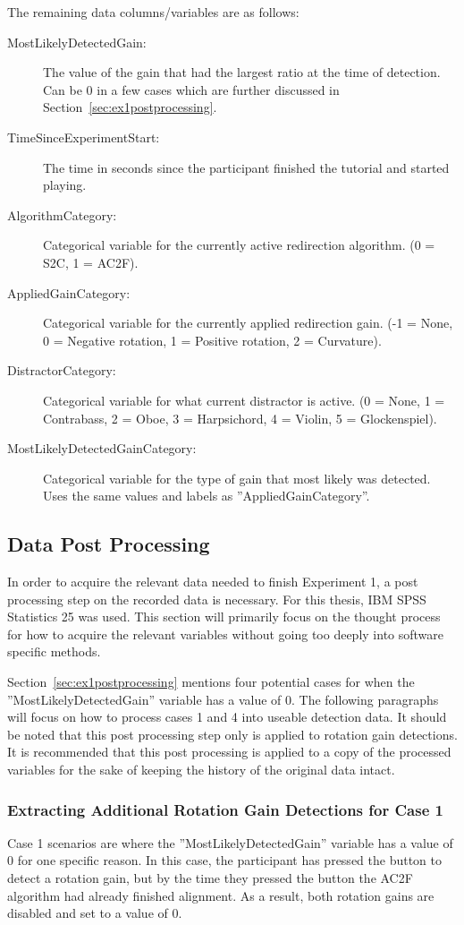 The remaining data columns/variables are as follows:
\begin{description}
   \item[MostLikelyDetectedGain:] The value of the gain that had the largest ratio at the time of detection. Can be 0 in a few cases which are further discussed in Section~\ref{sec:ex1postprocessing}.
   \item[TimeSinceExperimentStart:] The time in seconds since the participant finished the tutorial and started playing.
   \item[AlgorithmCategory:] Categorical variable for the currently active redirection algorithm. (0 = S2C, 1 = AC2F).
   \item[AppliedGainCategory:] Categorical variable for the currently applied redirection gain. (-1 = None, 0 = Negative rotation, 1 = Positive rotation, 2 = Curvature).
   \item[DistractorCategory:] Categorical variable for what current distractor is active. (0 = None, 1 = Contrabass, 2 = Oboe, 3 = Harpsichord, 4 = Violin, 5 = Glockenspiel).
   \item[MostLikelyDetectedGainCategory:] Categorical variable for the type of gain that most likely was detected. Uses the same values and labels as ''AppliedGainCategory''.
\end{description}

\subsection{Data Post Processing}\label{sec:ex1postprocessingdetails}
In order to acquire the relevant data needed to finish Experiment 1, a post processing step on the recorded data is necessary. For this thesis, IBM SPSS Statistics 25 was used. This section will primarily focus on the thought process for how to acquire the relevant variables without going too deeply into software specific methods. 

Section~\ref{sec:ex1postprocessing} mentions four potential cases for when the ''MostLikelyDetectedGain'' variable has a value of 0. The following paragraphs will focus on how to process cases 1 and 4 into useable detection data. It should be noted that this post processing step only is applied to rotation gain detections. It is recommended that this post processing is applied to a copy of the processed variables for the sake of keeping the history of the original data intact. 

\subsubsection{Extracting Additional Rotation Gain Detections for Case 1}
Case 1 scenarios are where the ''MostLikelyDetectedGain'' variable has a value of 0 for one specific reason. In this case, the participant has pressed the button to detect a rotation gain, but by the time they pressed the button the AC2F algorithm had already finished alignment. As a result, both rotation gains are disabled and set to a value of 0. 

